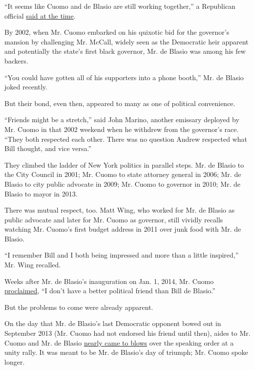``It seems like Cuomo and de Blasio are still working together,'' a
Republican official
\href{https://archive.nytimes3xbfgragh.onion/www.nytimes3xbfgragh.onion/library/politics/camp/122299sen-ny-gop.html}{said
at the time}.

By 2002, when Mr. Cuomo embarked on his quixotic bid for the governor's
mansion by challenging Mr. McCall, widely seen as the Democratic heir
apparent and potentially the state's first black governor, Mr. de Blasio
was among his few backers.

``You could have gotten all of his supporters into a phone booth,'' Mr.
de Blasio joked recently.

But their bond, even then, appeared to many as one of political
convenience.

``Friends might be a stretch,'' said John Marino, another emissary
deployed by Mr. Cuomo in that 2002 weekend when he withdrew from the
governor's race. ``They both respected each other. There was no question
Andrew respected what Bill thought, and vice versa.''

They climbed the ladder of New York politics in parallel steps. Mr. de
Blasio to the City Council in 2001; Mr. Cuomo to state attorney general
in 2006; Mr. de Blasio to city public advocate in 2009; Mr. Cuomo to
governor in 2010; Mr. de Blasio to mayor in 2013.

There was mutual respect, too. Matt Wing, who worked for Mr. de Blasio
as public advocate and later for Mr. Cuomo as governor, still vividly
recalls watching Mr. Cuomo's first budget address in 2011 over junk food
with Mr. de Blasio.

``I remember Bill and I both being impressed and more than a little
inspired,'' Mr. Wing recalled.

Weeks after Mr. de Blasio's inauguration on Jan. 1, 2014, Mr. Cuomo
\href{https://www.nytimes3xbfgragh.onion/2014/01/23/nyregion/cuomo-sweetens-pre-k-deal-whatever-mayor-needs.html}{proclaimed},
``I don't have a better political friend than Bill de Blasio.''

But the problems to come were already apparent.

On the day that Mr. de Blasio's last Democratic opponent bowed out in
September 2013 (Mr. Cuomo had not endorsed his friend until then), aides
to Mr. Cuomo and Mr. de Blasio
\href{https://www.wsj.com/articles/gov-andrew-cuomos-fiercest-defender-goes-on-trial-1516581201}{nearly
came to blows} over the speaking order at a unity rally. It was meant to
be Mr. de Blasio's day of triumph; Mr. Cuomo spoke longer.

